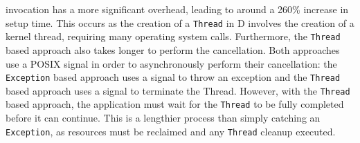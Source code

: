 invocation has a more significant overhead, leading to around a 260\% increase 
in setup time. This occurs as the creation of a \texttt{Thread} in D involves
the creation of a kernel thread, requiring many operating system calls.
Furthermore, the \texttt{Thread} based approach also takes longer to perform
the cancellation. Both approaches use a POSIX signal in order to asynchronously
perform their cancellation: the \texttt{Exception} based approach uses a signal
to throw an exception and the \texttt{Thread} based approach uses a signal to
terminate the Thread. However, with the \texttt{Thread} based approach, the
application must wait for the \texttt{Thread} to be fully completed before it can
continue. This is a lengthier process than simply catching an
\texttt{Exception}, as resources must be reclaimed and any \texttt{Thread}
cleanup executed. 


